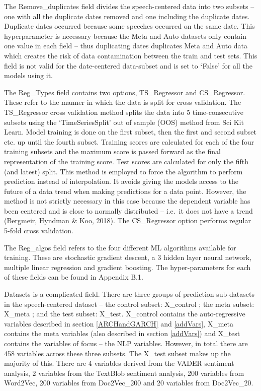 \documentclass[11pt,preprint, authoryear]{elsarticle}
\numberwithin{equation}{section}
\numberwithin{figure}{section}
\numberwithin{table}{section}
\begin{document}
The Remove\_duplicates field divides the speech-centered data into two
subsets -- one with all the duplicate dates removed and one including
the duplicate dates. Duplicate dates occurred because some speeches
occurred on the same date. This hyperparameter is necessary because the
Meta and Auto datasets only contain one value in each field -- thus
duplicating dates duplicates Meta and Auto data which creates the risk
of data contamination between the train and test sets. This field is not
valid for the date-centered data-subset and is set to `False' for all
the models using it.

The Reg\_Types field contains two options, TS\_Regressor and
CS\_Regressor. These refer to the manner in which the data is split for
cross validation. The TS\_Regressor cross validation method splits the
data into 5 time-consecutive subsets using the `TimeSeriesSplit' out of
sample (OOS) method from Sci Kit Learn. Model training is done on the
first subset, then the first and second subset etc. up until the fourth
subset. Training scores are calculated for each of the four training
subsets and the maximum score is passed forward as the final
representation of the training score. Test scores are calculated for
only the fifth (and latest) split. This method is employed to force the
algorithm to perform prediction instead of interpolation. It avoids
giving the models access to the future of a data trend when making
predictions for a data point. However, the method is not strictly
necessary in this case because the dependent variable has been centered
and is close to normally distributed -- i.e.~it does not have a trend
(Bergmeir, Hyndman \& Koo, 2018). The CS\_Regressor option performs
regular 5-fold cross validation.

The Reg\_algos field refers to the four different ML algorithms
available for training. These are stochastic gradient descent, a 3
hidden layer neural network, multiple linear regression and gradient
boosting. The hyper-parameters for each of these fields can be found in
Appendix B.1.

Datasets is a complicated field. There are three groups of prediction
sub-datasets in the speech-centered dataset -- the control subset:
X\_control ; the meta subset: X\_meta ; and the test subset: X\_test.
X\_control contains the auto-regressive variables described in section
\ref{ARCHandGARCH} and \ref{addVars}, X\_meta contains the meta
variables (also described in section \ref{addVars}) and X\_test contains
the variables of focus -- the NLP variables. However, in total there are
458 variables across these three subsets. The X\_test subset makes up
the majority of this. There are 4 variables derived from the VADER
sentiment analysis, 2 variables from the TextBlob sentiment analysis,
200 variables from Word2Vec, 200 variables from Doc2Vec\_200 and 20
variables from Doc2Vec\_20.
\end{document}
